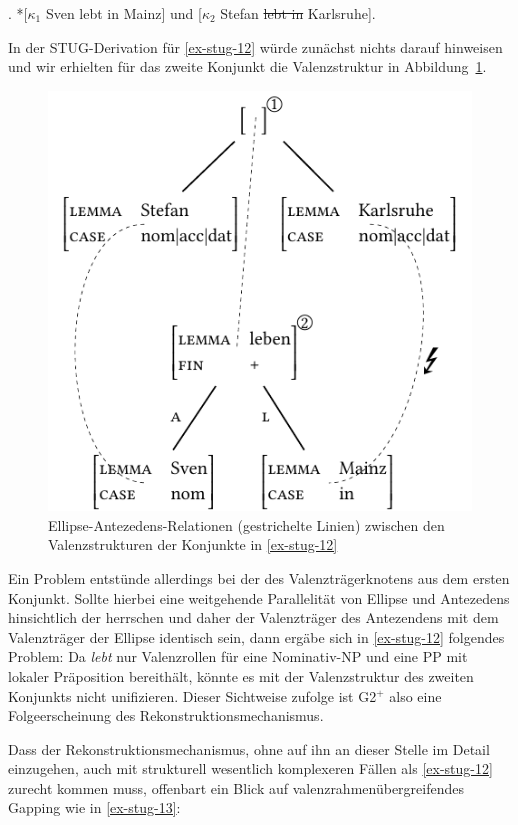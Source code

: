 \ex. \label{ex-stug-12} *[$\kappa_1$ Sven lebt in Mainz] und [$\kappa_2$ Stefan \sout{lebt in} Karlsruhe]. 

In der STUG-Derivation für \ref{ex-stug-12} würde zunächst nichts darauf hinweisen und wir erhielten für das zweite Konjunkt die Valenzstruktur in Abbildung~\ref{fig-stug-16}. 
\begin{figure}[t]
\centering
\includegraphics{graphics/abb916.pdf}
\caption{\label{fig-stug-16}Ellipse-Antezedens-Relationen (gestrichelte Linien) zwischen den Valenzstrukturen der Konjunkte in \ref{ex-stug-12}}
\end{figure}
Ein Problem entstünde allerdings bei der  des Valenzträgerknotens aus dem ersten Konjunkt. Sollte hierbei eine weitgehende Parallelität von Ellipse und Antezedens hinsichtlich der  herrschen und daher der Valenzträger des Antezendens mit dem Valenzträger der Ellipse identisch sein, dann ergäbe sich in \ref{ex-stug-12} folgendes Problem: Da {\it lebt} nur Valenzrollen für eine Nominativ-NP und eine PP mit lokaler Präposition bereithält, könnte es mit der Valenzstruktur des zweiten Konjunkts nicht unifizieren. Dieser Sichtweise zufolge ist G2$^+$ also eine Folgeerscheinung des Rekonstruktionsmechanismus.  

Dass der Rekonstruktionsmechanismus, ohne auf ihn an dieser Stelle im Detail einzugehen, auch mit strukturell wesentlich komplexeren Fällen als \ref{ex-stug-12} zurecht kommen muss, offenbart ein Blick auf valenzrahmenübergreifendes Gapping wie in \ref{ex-stug-13}:

